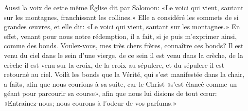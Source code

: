 Aussi la voix de cette même Église dit par Salomon:
	«Le voici qui vient, sautant sur les montagnes, franchissant les collines.»
Elle a considéré les sommets de si grandes œuvres, et elle dit:
	«Le voici qui vient, sautant sur les montagnes.»
En effet, venant pour nous notre rédemption,
	il a fait, si je puis m’exprimer ainsi, comme des bonds.
Voulez-vous, mes très chers frères, connaître ces bonds?
	Il est venu du ciel dans le sein d’une vierge,
	de ce sein il est venu dans la crèche,
	de la crèche il est venu sur la croix,
	de la croix au sépulcre,
	et du sépulcre il est retourné au ciel.
Voilà les bonds que la Vérité, qui s’est manifestée dans la chair, a faits,
	afin que nous courions à sa suite,
	car le Christ «s’est élancé comme un géant pour parcourir sa course»,
	afin que nous lui disions de tout cœur:
	«Entraînez-nous; nous courons à l’odeur de vos parfums.»
